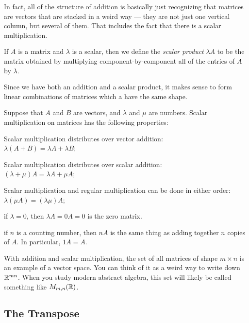 \documentclass[elementsmain.tex]{subfiles}
\begin{document}
In fact, all of the structure of addition is basically just recognizing that matrices are vectors that are stacked in a weird way --- they are not just one vertical column, but several of them. That includes the fact that there is a scalar multiplication.

\begin{definition} If $A$ is a matrix and $\lambda$ is a scalar, then we define the \emph{scalar product} $\lambda A$ to be the matrix obtained by multiplying component-by-component all of the entries of $A$ by $\lambda$.

Since we have both an addition and a scalar product, it makes sense to form linear combinations of matrices which a have the same shape.
\end{definition}

\begin{theorem}
Suppose that $A$ and $B$ are vectors, and $\lambda$ and $\mu$ are numbers. Scalar multiplication on matrices has the following properties:
\begin{compactitem}
\item Scalar multiplication distributes over vector addition:\\ $\lambda(A+B) = \lambda A + \lambda B$;
\item Scalar multiplication distributes over scalar addition:\\ $(\lambda + \mu)A = \lambda A + \mu A$;
\item Scalar multiplication and regular multiplication can be done in either order: $\lambda(\mu A) = (\lambda\mu) A$;
\item if $\lambda = 0$, then $\lambda A = 0 A = 0$ is the zero matrix.
\item if $n$ is a counting number, then $nA$ is the same thing as adding together $n$ copies of $A$. In particular, $1A = A$.
\end{compactitem}
\end{theorem}

\begin{remark}
With addition and scalar multiplication, the set of all matrices of shape $m\times n$ is an example of a vector space. You can think of it as a weird way to write down $\mathbb{R}^{mn}$. When you study modern abstract algebra, this set will likely be called something like $M_{m,n}(\mathbb{R})$.
\end{remark}


\subsection*{The Transpose}
\end{document}
